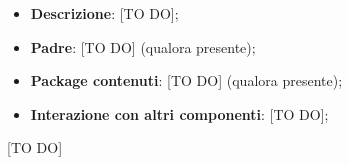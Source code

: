   \begin{itemize}
    \item \textbf{Descrizione}: [TO DO];
    \item \textbf{Padre}: [TO DO] (qualora presente);
    \item \textbf{Package contenuti}: [TO DO] (qualora presente);
    \item \textbf{Interazione con altri componenti}: [TO DO];
  \end{itemize}
[TO DO]
